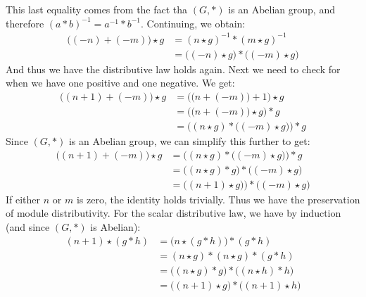     This last equality comes from the fact tha $(G,*)$ is an Abelian group, and
    therefore $(a*b)^{\minus{1}}=a^{\minus{1}}*b^{\minus{1}}$. Continuing, we
    obtain:
    \begin{subequations}
        \begin{align}
            \big((\minus{n})+(\minus{m})\big)\star{g}
            &=(n\star{g})^{\minus{1}}*(m\star{g})^{\minus{1}}\\
            &=\big((\minus{n})\star{g}\big)*\big((\minus{m})\star{g}\big)
        \end{align}
    \end{subequations}
    And thus we have the distributive law holds again. Next we need to check for
    when we have one positive and one negative. We get:
    \begin{subequations}
        \begin{align}
            \big((n+1)+(\minus{m})\big)\star{g}
            &=\Big(\big(n+(\minus{m})\big)+1\Big)\star{g}\\
            &=\Big(\big(n+(\minus{m})\big)\star{g}\Big)*g\\
            &=\Big((n\star{g})*\big((\minus{m})\star{g}\big)\Big)*g
        \end{align}
    \end{subequations}
    Since $(G,*)$ is an Abelian group, we can simplify this further to get:
    \begin{subequations}
        \begin{align}
            \big((n+1)+(\minus{m})\big)\star{g}
            &=\Big((n\star{g})*\big((\minus{m})\star{g}\big)\Big)*g\\
            &=\Big((n\star{g})*g\Big)*\big((\minus{m})\star{g}\big)\\
            &=\Big((n+1)\star{g})\Big)*\big((\minus{m})\star{g}\big)
        \end{align}
    \end{subequations}
    If either $n$ or $m$ is zero, the identity holds trivially. Thus we have the
    preservation of module distributivity. For the scalar distributive law, we
    have by induction (and since $(G,*)$ is Abelian):
    \begin{subequations}
        \begin{align}
            (n+1)\star(g*h)
            &=\big(n\star(g*h)\big)*(g*h)\\
            &=(n\star{g})*(n\star{g})*(g*h)\\
            &=\big((n\star{g})*g\big)*\big((n\star{h})*h\big)\\
            &=\big((n+1)\star{g}\big)*\big((n+1)\star{h}\big)
        \end{align}
    \end{subequations}
